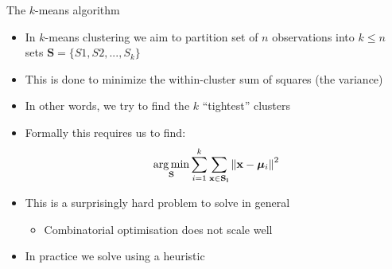 \documentclass[aspectratio=169]{beamer}
\begin{document}
\begin{frame}{The $k$-means algorithm}
  \begin{itemize}
    \item In $k$-means clustering we aim to partition set of $n$ observations into $k \leq n$ sets $\mathbf{S} = \{S1, S2, ..., S_k\}$
    \item This is done to minimize the within-cluster sum of squares (the variance)
    \item In other words, we try to find the $k$ ``tightest'' clusters
    \item Formally this requires us to find:
    \begin{equation*}
      \operatorname*{arg\,min}_\mathbf{S} \sum_{i=1}^k\sum_{\mathbf{x\in S_i}}\left\|\mathbf{x} -\bm{\mu}_{i}\right\|^{2}
    \end{equation*}
    \pause
    \item This is a surprisingly hard problem to solve in general
    \begin{itemize}
      \item Combinatorial optimisation does not scale well
    \end{itemize}
    \item In practice we solve using a heuristic
  \end{itemize}
\end{frame}
\end{document}

